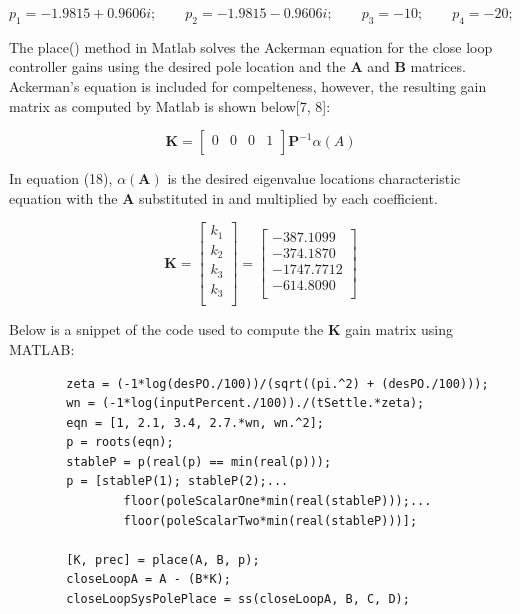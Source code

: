 \documentclass[titlepage]{article}
\begin{document}
\begin{equation}
	p_1 = -1.9815+0.9606i;\quad\quad
	p_2 = -1.9815-0.9606i;\quad\quad
	p_3 = -10;\quad\quad
	p_4 = -20;\quad\quad
\end{equation}


The place() method in Matlab solves the Ackerman equation for the close loop controller gains using the desired pole location and the \textbf{A} and \textbf{B} matrices. Ackerman's equation is included for compelteness, however, the resulting gain matrix as computed by Matlab is shown below[7, 8]:

\begin{equation}
\textbf{K} = \begin{bmatrix}0 & 0 & 0 & 1\\\end{bmatrix}\textbf{P}^{-1}\alpha\left(A\right)
\end{equation}

In equation (18), 
\(\alpha\left(\textbf{A}\right)\) is the desired eigenvalue locations characteristic equation with the \textbf{A} substituted in and multiplied by each coefficient.

	\[\textbf{K} = \begin{bmatrix}
		k_1\\
		k_2\\
		k_3\\
		k_3\\
	\end{bmatrix} = \begin{bmatrix}
		-387.1099\\
		-374.1870\\
		-1747.7712\\
		-614.8090\\
	\end{bmatrix}\]

	Below is a snippet of the code used to compute the \textbf{K} gain matrix using MATLAB:
	\begin{lstlisting}[style=Matlab-editor]
		%% Pole Placement
		zeta = (-1*log(desPO./100))/(sqrt((pi.^2) + (desPO./100)));
		wn = (-1*log(inputPercent./100))./(tSettle.*zeta);
		eqn = [1, 2.1, 3.4, 2.7.*wn, wn.^2];
		p = roots(eqn);
		stableP = p(real(p) == min(real(p)));
		p = [stableP(1); stableP(2);...
		        floor(poleScalarOne*min(real(stableP)));...
		        floor(poleScalarTwo*min(real(stableP)))];

		[K, prec] = place(A, B, p);
		closeLoopA = A - (B*K);
		closeLoopSysPolePlace = ss(closeLoopA, B, C, D);
	\end{lstlisting}
\end{document}

